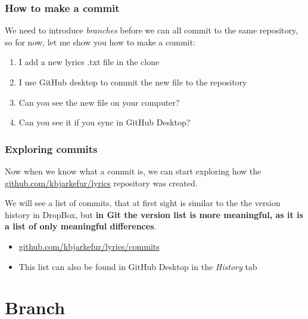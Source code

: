 \documentclass[aspectratio=169]{beamer} %
\newcommand{\trainingURL}[1]{{\color{blue}\url{#1}}}
\newcommand{\traininerUsername}{kbjarkefur}
\newcommand{\repoName}{\traininerUsername/lyrics}
\newcommand{\trainingRepoURL}[1]{\trainingURL{github.com/\repoName #1}}
\begin{document}
\begin{frame}
\frametitle{How to make a commit}

	We need to introduce \textit{branches} before we can all commit to the same repository, so for now, let me show you how to make a commit:

	\begin{enumerate}
		\item I add a new lyrics .txt file in the clone
		\item I use GitHub desktop to commit the new file to the repository
		\item Can you see the new file on your computer?
		\item Can you see it if you sync in GitHub Desktop?
	\end{enumerate}

\end{frame}


\begin{frame}
\frametitle{Exploring commits}

	Now when we know what a commit is, we can start exploring how the \trainingRepoURL{} repository was created.

	\vspace{.25cm}

	We will see a list of commits, that at first sight is similar to the the version history in DropBox, but \textbf{in Git the version list is more meaningful, as it is a list of only meaningful differences}.

	\vspace{.25cm}

	\begin{itemize}
		\item \trainingRepoURL{/commits}
		\item This list can also be found in GitHub Desktop in the \textit{History} tab
	\end{itemize}

\end{frame}

\section{Branch}
\end{document}
